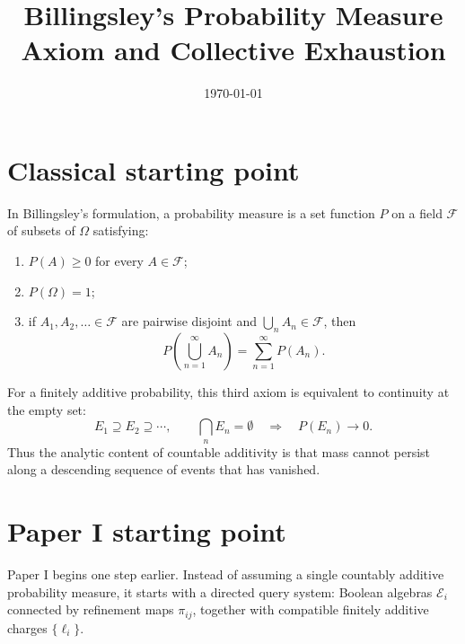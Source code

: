 \documentclass[11pt]{article}
\title{Billingsley's Probability Measure Axiom and Collective Exhaustion}
\author{}
\date{\today}
\begin{document}
\maketitle

\section*{Classical starting point}

In Billingsley's formulation, a probability measure is a set function
$P$ on a field $\mathcal F$ of subsets of $\Omega$ satisfying:
\begin{enumerate}
  \item[(i)] $P(A) \ge 0$ for every $A \in \mathcal F$;
  \item[(ii)] $P(\Omega)=1$;
  \item[(iii)] if $A_1,A_2,\ldots \in \mathcal F$ are pairwise disjoint and
  $\bigcup_n A_n \in \mathcal F$, then
  \[
    P\!\left(\bigcup_{n=1}^{\infty} A_n\right)
    =
    \sum_{n=1}^{\infty} P(A_n).
  \]
\end{enumerate}

For a finitely additive probability, this third axiom is equivalent to
continuity at the empty set:
\[
  E_1 \supseteq E_2 \supseteq \cdots,
  \qquad
  \bigcap_n E_n = \emptyset
  \quad\Longrightarrow\quad
  P(E_n) \to 0.
\]
Thus the analytic content of countable additivity is that mass cannot
persist along a descending sequence of events that has vanished.

\section*{Paper I starting point}

Paper I begins one step earlier.  Instead of assuming a single
countably additive probability measure, it starts with a directed query
system: Boolean algebras $\mathcal E_i$ connected by refinement maps
$\pi_{ij}$, together with compatible finitely additive charges
$\{\ell_i\}$.
\end{document}
